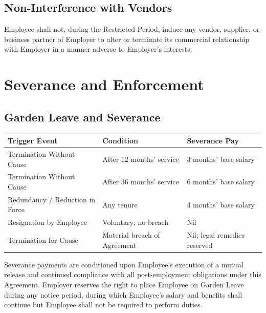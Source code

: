 \documentclass[11pt,a4paper]{article}
\begin{document}
\subsection{Non-Interference with Vendors}
\noindent
Employee shall not, during the Restricted Period, induce any vendor, supplier, or
business partner of Employer to alter or terminate its commercial relationship with
Employer in a manner adverse to Employer's interests.

\section{Severance and Enforcement}

\subsection{Garden Leave and Severance}

\begin{tcolorbox}[ndabox, title={\faPen\enspace Severance Terms at a Glance}]
  \small
  \begin{tabularx}{\linewidth}{@{}lXl@{}}
    \toprule
    \rowcolor{NavyDeep!12}
    \textbf{Trigger Event} & \textbf{Condition} & \textbf{Severance Pay} \\
    \midrule
    Termination Without Cause & After 12 months' service & 3 months' base salary \\
    \rowcolor{SilverLight}
    Termination Without Cause & After 36 months' service & 6 months' base salary \\
    Redundancy / Reduction in Force & Any tenure & 4 months' base salary \\
    \rowcolor{SilverLight}
    Resignation by Employee & Voluntary; no breach & Nil \\
    Termination for Cause & Material breach of Agreement & Nil; legal remedies reserved \\
    \bottomrule
  \end{tabularx}
\end{tcolorbox}

\vspace{6pt}

\noindent
Severance payments are conditioned upon Employee's execution of a mutual release and
continued compliance with all post-employment obligations under this Agreement. Employer
reserves the right to place Employee on Garden Leave during any notice period, during
which Employee's salary and benefits shall continue but Employee shall not be required
to perform duties.
\end{document}
